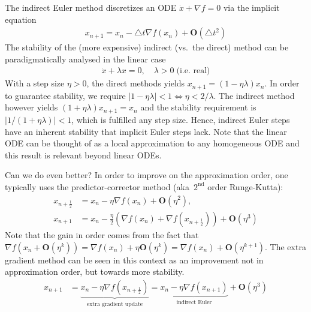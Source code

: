 \documentclass{article}
\begin{document}
The indirect  Euler method discretizes an ODE $\dot x + \nabla f =0$ via the implicit equation 
\begin{align}
x_{n+1} = x_n - \triangle t \nabla f(x_n) + \mathbf O(\triangle t^2)
\end{align}
The stability of the (more expensive) indirect (vs.~the direct) method can be paradigmatically analysed in the linear case
\begin{align}
\dot x  + \lambda x = 0, \quad \lambda >0 \; \text{(i.e.~real)}
\end{align}
With a step size $\eta>0$, the direct methods yields $x_{n+1} = (1 - \eta \lambda) x_n$. In order to guarantee stability, we require $|1-\eta \lambda| <1 \iff \eta < 2/\lambda$. The indirect method however yields $(1+\eta \lambda) x_{n+1} = x_n$ and the stability requirement is $| 1 / (1 + \eta\lambda)|<1$, which is fulfilled any step size. Hence, indirect Euler steps have an inherent stability that implicit Euler steps lack. Note that the linear ODE can be thought of as a local approximation to any homogeneous ODE and this result is relevant beyond linear ODEs. 

Can we do even better? In order to improve on the approximation order, one typically uses the predictor-corrector method (aka~$2^{\text{nd}}$ order Runge-Kutta):
\begin{align}
x_{n+\frac 12} & = x_n - \eta \nabla f(x_n) + \mathbf O(\eta^2),\quad \\
x_{n+1} & = x_n - \frac \eta 2 \left( \nabla f(x_n) + \nabla f(x_{n+\frac 12}) \right)+ \mathbf O(\eta^3)
\end{align}
Note that the gain in order comes from the fact that $\nabla f(x_n + \mathbf O(\eta^k)) = \nabla f(x_n) + \eta \mathbf O(\eta^{k})= \nabla f(x_n) +\mathbf O(\eta^{k+1})$. The extra gradient method can be seen in this context as an improvement not in approximation order, but towards more stability. 
\begin{align}
x_{n+1} & = \underbrace{x_n - \eta \nabla f(x_{n+\frac 12})}_{\text{extra gradient update}} = \underbrace{x_n - \eta \nabla f(x_{n+1})}_{\text{indirect Euler}} + \mathbf O(\eta^3)
\end{align}





\end{document}
